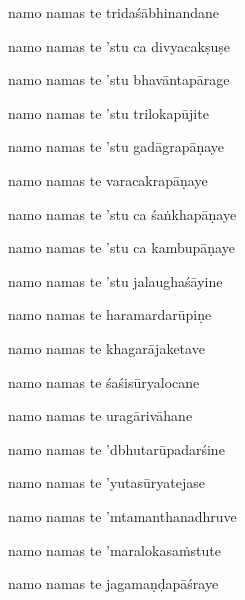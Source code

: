 \ujvers\nemsloka 
namo namas te tridaśābhinandane
\dontdisplaylinenum

\nemslokab 
namo namas te 'stu ca divyacakṣuṣe \danda\dontdisplaylinenum

\nemslokac 
namo namas te 'stu bhavāntapārage
\dontdisplaylinenum

\nemslokad 
namo namas te 'stu trilokapūjite \veg\dontdisplaylinenum

\ujvers\nemsloka 
namo namas te 'stu gadāgrapāṇaye
\dontdisplaylinenum

\nemslokab 
namo namas te varacakrapāṇaye \danda\dontdisplaylinenum

\nemslokac 
namo namas te 'stu ca śaṅkhapāṇaye
\dontdisplaylinenum

\nemslokad 
namo namas te 'stu ca kambupāṇaye \veg\dontdisplaylinenum
{}

\ujvers\nemsloka 
namo namas te 'stu jalaughaśāyine
\dontdisplaylinenum

\nemslokab 
namo namas te haramardarūpiṇe \danda\dontdisplaylinenum

\nemslokac 
namo namas te khagarājaketave
\dontdisplaylinenum

\nemslokad 
namo namas te śaśisūryalocane \veg\dontdisplaylinenum
{}

\ujvers\nemsloka 
namo namas te uragārivāhane
\dontdisplaylinenum

\nemslokab 
namo namas te 'dbhutarūpadarśine \danda\dontdisplaylinenum

\nemslokac 
namo namas te 'yutasūryatejase
\dontdisplaylinenum

\nemslokad 
namo namas te 'mtamanthanadhruve \veg\dontdisplaylinenum
{}

\ujvers\nemsloka 
namo namas te 'maralokasaṁstute
\dontdisplaylinenum

\nemslokab 
namo namas te jagamaṇḍapāśraye \danda\dontdisplaylinenum

